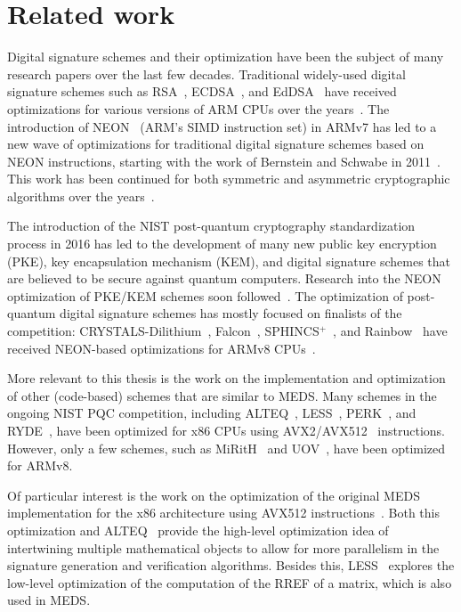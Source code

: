 \documentclass[11pt,a4paper]{report}
\theoremstyle{definition}
\begin{document}
\section{Related work}
Digital signature schemes and their optimization have been the subject of many research papers over the last few decades. Traditional widely-used digital signature schemes such as RSA~\cite{rivest1978method}, ECDSA~\cite{johnson2001elliptic}, and EdDSA~\cite{bernstein2012high} have received optimizations for various versions of ARM CPUs over the years~\cite{talal2009efficient,tanik2001ecdsa,xu2001efficient}. The introduction of NEON~\cite{ARMv8A-ProgrammersGuide} (ARM's SIMD instruction set) in ARMv7 has led to a new wave of optimizations for traditional digital signature schemes based on NEON instructions, starting with the work of Bernstein and Schwabe in 2011~\cite{bernstein2012neon}. This work has been continued for both symmetric and asymmetric cryptographic algorithms over the years~\cite{azarderaksh2015neon,gouvea2015implementing,seo2016efficient,seo2014parallel,wang2015higher}.

The introduction of the NIST post-quantum cryptography standardization process in 2016 has led to the development of many new public key encryption (PKE), key encapsulation mechanism (KEM), and digital signature schemes that are believed to be secure against quantum computers. Research into the NEON optimization of PKE/KEM schemes soon followed~\cite{nguyen2021fast,nguyen2021optimized,ortiz2022evaluation,sim2022mceliece,streit2018post}. The optimization of post-quantum digital signature schemes has mostly focused on finalists of the competition: CRYSTALS-Dilithium~\cite{ducas2018crystals}, Falcon~\cite{fouque2018falcon}, SPHINCS$^+$~\cite{bernstein2015sphincs}, and Rainbow~\cite{ding2005rainbow} have received NEON-based optimizations for ARMv8 CPUs~\cite{becker2021neon,becker2022hybrid,kim2022accelerating,kim2022crystals,kwon2023look,nguyen2023fast}.

More relevant to this thesis is the work on the implementation and optimization of other (code-based) schemes that are similar to MEDS. Many schemes in the ongoing NIST PQC competition, including ALTEQ~\cite{blaser2024alteq}, LESS~\cite{baldi2024less}, PERK~\cite{aaraj2023perk}, and RYDE~\cite{aragon2023ryde}, have been optimized for x86 CPUs using AVX2/AVX512~\cite{intel-avx512} instructions. However, only a few schemes, such as MiRitH~\cite{adj2023mirith} and UOV~\cite{beullens2023uov}, have been optimized for ARMv8.

Of particular interest is the work on the optimization of the original MEDS implementation for the x86 architecture using AVX512 instructions~\cite{IIS2023HighLevel, IIS2023LowLevel}. Both this optimization and ALTEQ~\cite{blaser2024alteq} provide the high-level optimization idea of intertwining multiple mathematical objects to allow for more parallelism in the signature generation and verification algorithms. Besides this, LESS~\cite{baldi2024less} explores the low-level optimization of the computation of the RREF of a matrix, which is also used in MEDS.
\end{document}
